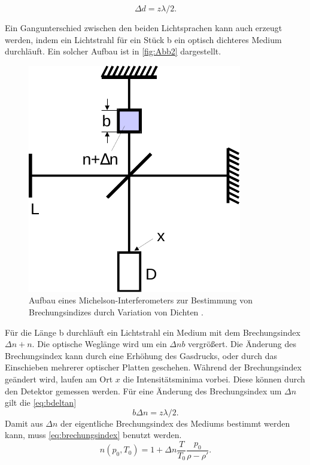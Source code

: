 \begin{equation}
    \Delta d = z \lambda/2. 
    \label{eq:deltad}
\end{equation}

Ein Gangunterschied zwischen den beiden Lichtsprachen kann auch erzeugt werden, indem ein Lichtstrahl für ein Stück b ein optisch dichteres Medium durchläuft.
Ein solcher Aufbau ist in \autoref{fig:Abb2} dargestellt.
\begin{figure}[H]
    \centering
    \includegraphics{figures/Abb2.pdf}
    \caption{Aufbau eines Michelson-Interferometers zur Bestimmung von Brechungsindizes durch Variation von Dichten \cite{ap11}.}
    \label{fig:Abb2}
\end{figure}

Für die Länge b durchläuft ein Lichtstrahl ein Medium mit dem Brechungsindex $ \Delta n + n$. Die optische Weglänge wird um ein $\Delta n b$ vergrößert.
Die Änderung des Brechungsindex kann durch eine Erhöhung des Gasdrucks, oder durch das Einschieben mehrerer optischer Platten geschehen.
Während der Brechungsindex geändert wird, laufen am Ort $x$ die Intensitätsminima vorbei. Diese können durch den Detektor gemessen werden.
Für eine Änderung des Brechungsindex um $\Delta n$ gilt die \eqref{eq:bdeltan}
\begin{equation}
    b \Delta n = z λ/2. 
    \label{eq:bdeltan}
\end{equation}
Damit aus $\Delta n$ der eigentliche Brechungsindex des Mediums bestimmt werden kann, muss \eqref{eq:brechungsindex} benutzt werden.
\begin{equation}
    n(p_0,T_0) = 1 + \Delta n \frac{T}{T_0} \frac{p_0}{\rho - \rho'} .
    \label{eq:brechungsindex}
\end{equation}
